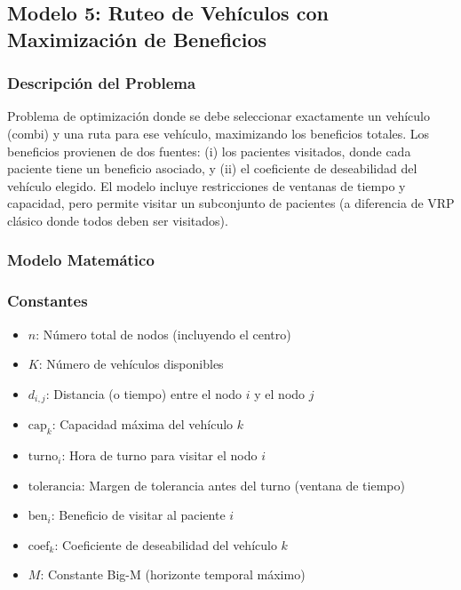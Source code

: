 \documentclass[12pt]{article}
\begin{document}
\subsection{Modelo 5: Ruteo de Vehículos con Maximización de Beneficios}

\subsubsection{Descripción del Problema}

Problema de optimización donde se debe seleccionar exactamente un vehículo (combi) y una ruta para ese vehículo, maximizando los beneficios totales. Los beneficios provienen de dos fuentes: (i) los pacientes visitados, donde cada paciente tiene un beneficio asociado, y (ii) el coeficiente de deseabilidad del vehículo elegido. El modelo incluye restricciones de ventanas de tiempo y capacidad, pero permite visitar un subconjunto de pacientes (a diferencia de VRP clásico donde todos deben ser visitados).

\subsubsection{Modelo Matemático}

\subsubsection*{Constantes}

\begin{itemize}
    \item $n$: Número total de nodos (incluyendo el centro)
    \item $K$: Número de vehículos disponibles
    \item $d_{i,j}$: Distancia (o tiempo) entre el nodo $i$ y el nodo $j$
    \item $\text{cap}_k$: Capacidad máxima del vehículo $k$
    \item $\text{turno}_i$: Hora de turno para visitar el nodo $i$
    \item $\text{tolerancia}$: Margen de tolerancia antes del turno (ventana de tiempo)
    \item $\text{ben}_i$: Beneficio de visitar al paciente $i$
    \item $\text{coef}_k$: Coeficiente de deseabilidad del vehículo $k$
    \item $M$: Constante Big-M (horizonte temporal máximo)
\end{itemize}
\end{document}

